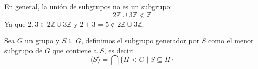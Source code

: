 \begin{ejemplo}
    En general, la unión de subgrupos no es un subgrupo:
    \begin{equation*}
        2\mathbb{Z} \cup 3\mathbb{Z}  \not< \mathbb{Z}
    \end{equation*}
    Ya que $2,3\in 2\mathbb{Z}\cup 3\mathbb{Z}$ y $2+3 = 5\notin 2\mathbb{Z}\cup 3\mathbb{Z}$.
\end{ejemplo}

\begin{definicion}
    Sea $G$ un grupo y $S\subseteq G$, definimos el subgrupo generador por $S$ como el menor subgrupo de $G$ que contiene a $S$, es decir:
    \begin{equation*}
        \langle S \rangle  = \bigcap \{H < G \mid S\subseteq H\}
    \end{equation*}
\end{definicion}

